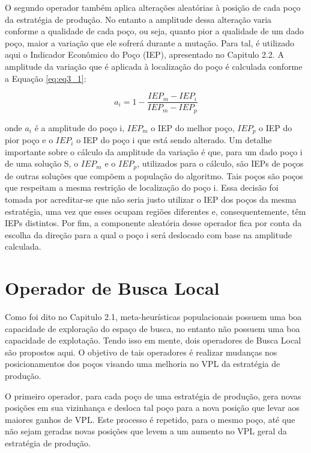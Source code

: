 O segundo operador também aplica alterações aleatórias à posição de cada poço da estratégia de produção. No entanto a amplitude dessa alteração varia conforme a qualidade de cada poço, ou seja, quanto pior a qualidade de um dado poço, maior a variação que ele sofrerá durante a mutação. Para tal, é utilizado aqui o Indicador Econômico do Poço (IEP), apresentado no Capitulo 2.2. A amplitude da variação que é aplicada à localização do poço é calculada conforme a Equação \ref{eq:eq3_1}:

\begin{equation}
  \label{eq:eq3_1}
  a_i = 1 - \frac{IEP_m -IEP_i}{IEP_m -IEP_p}
\end{equation}

onde $a_i$ é a amplitude do poço i, $IEP_m$ o IEP do melhor poço, $IEP_p$ o IEP do pior poço e o $IEP_i$  o IEP do poço i que está sendo alterado. Um detalhe importante sobre o cálculo da amplitude da variação é que, para um dado poço i de uma solução S, o $IEP_m$ e o $IEP_p$, utilizados para o cálculo, são IEPs de poços de outras soluções que compõem a população do algoritmo. Tais poços são poços que respeitam a mesma restrição de localização do poço i. Essa decisão foi tomada por acreditar-se que não seria justo utilizar o IEP dos poços da mesma estratégia, uma vez que esses ocupam regiões diferentes e, consequentemente, têm IEPs distintos. Por fim, a componente aleatória desse operador fica por conta da escolha da direção para a qual o poço i será deslocado com base na amplitude calculada.

\section{Operador de Busca Local}

Como foi dito no Capitulo 2.1, meta-heurísticas populacionais possuem uma boa capacidade de exploração do espaço de busca, no entanto não possuem uma boa capacidade de explotação. Tendo isso em mente, dois operadores de Busca Local são propostos aqui. O objetivo de tais operadores é realizar mudanças nos posicionamentos dos poços visando uma melhoria no VPL da estratégia de produção.

O primeiro operador, para cada poço de uma estratégia de produção, gera novas posições em sua vizinhança e desloca tal poço para a nova posição que levar aos maiores ganhos de VPL. Este processo é repetido, para o mesmo poço, até que não sejam geradas novas posições que levem a um aumento no VPL geral da estratégia de produção.

